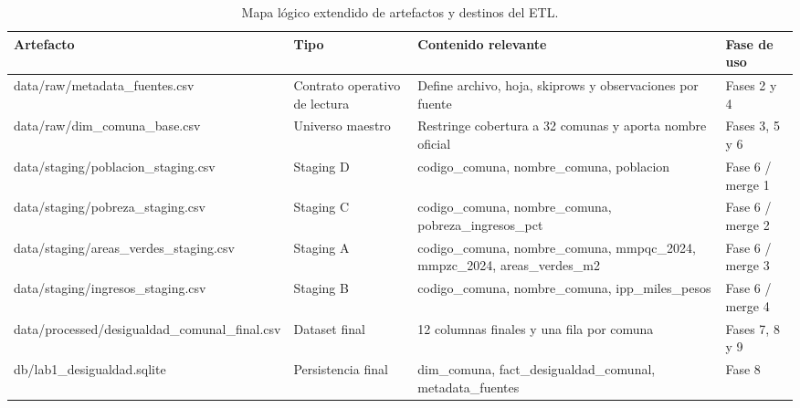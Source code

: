 \begin{table}[htbp]
\centering
\footnotesize
\caption{Mapa lógico extendido de artefactos y destinos del ETL.}
\begin{tabular}{|p{4.3cm}|p{2.5cm}|p{5.2cm}|p{2.4cm}|}
\hline
Artefacto & Tipo & Contenido relevante & Fase de uso \\
\hline
data/raw/metadata\_fuentes.csv & Contrato operativo de lectura & Define archivo, hoja, skiprows y observaciones por fuente & Fases 2 y 4 \\
data/raw/dim\_comuna\_base.csv & Universo maestro & Restringe cobertura a 32 comunas y aporta nombre oficial & Fases 3, 5 y 6 \\
data/staging/poblacion\_staging.csv & Staging D & codigo\_comuna, nombre\_comuna, poblacion & Fase 6 / merge 1 \\
data/staging/pobreza\_staging.csv & Staging C & codigo\_comuna, nombre\_comuna, pobreza\_ingresos\_pct & Fase 6 / merge 2 \\
data/staging/areas\_verdes\_staging.csv & Staging A & codigo\_comuna, nombre\_comuna, mmpqc\_2024, mmpzc\_2024, areas\_verdes\_m2 & Fase 6 / merge 3 \\
data/staging/ingresos\_staging.csv & Staging B & codigo\_comuna, nombre\_comuna, ipp\_miles\_pesos & Fase 6 / merge 4 \\
data/processed/desigualdad\_comunal\_final.csv & Dataset final & 12 columnas finales y una fila por comuna & Fases 7, 8 y 9 \\
db/lab1\_desigualdad.sqlite & Persistencia final & dim\_comuna, fact\_desigualdad\_comunal, metadata\_fuentes & Fase 8 \\
\hline
\end{tabular}
\end{table}
